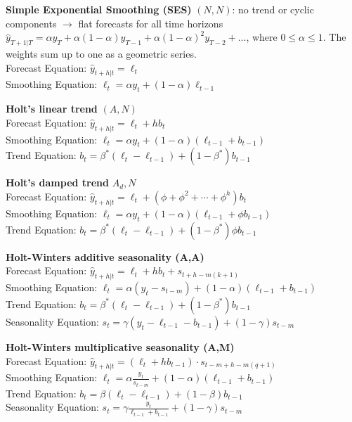 \begin{minipage}[t]{0.49\textwidth}
\textbf{Simple Exponential Smoothing (SES)} \((N,N)\): no trend or cyclic components \(\rightarrow\) flat forecasts for all time horizons\\
$ \hat{y}_{T+1|T} = \alpha y_{T} + \alpha (1 - \alpha) y_{T-1} + \alpha (1 - \alpha)^2 y_{T-2} + \ldots $,
where $ 0 \le \alpha \le 1 $. The weights sum up to one as a geometric series.\\
Forecast Equation: $ \hat{y}_{t+h|t} = \ell_t $\\
Smoothing Equation: $ \ell_t = \alpha y_t + (1 - \alpha) \ell_{t-1} $
\end{minipage}
\hfill
\begin{minipage}[t]{0.49\textwidth}
\textbf{Holt's linear trend} \((A,N)\)\\
Forecast Equation: $ \hat{y}_{t+h|t} = \ell_t + h b_{t} $\\
Smoothing Equation: $ \ell_t = \alpha y_t + (1 - \alpha) (\ell_{t-1} + b_{t-1}) $\\
Trend Equation: $ b_t = \beta^* (\ell_t - \ell_{t-1}) + (1 - \beta^*) b_{t-1} $

\textbf{Holt's damped trend} \(A_d,N\)\\
Forecast Equation: $ \hat{y}_{t+h|t} = \ell_t + (\phi + \phi^2 + \cdots + \phi^h) b_{t} $\\
Smoothing Equation: $ \ell_t = \alpha y_t + (1 - \alpha) (\ell_{t-1} + \phi b_{t-1}) $\\
Trend Equation: $ b_t = \beta^* (\ell_t - \ell_{t-1}) + (1 - \beta^*) \phi b_{t-1} $
\end{minipage}

\begin{minipage}[t]{0.49\textwidth}
\textbf{Holt-Winters additive seasonality (A,A)}\\
Forecast Equation: $ \hat{y}_{t+h|t} = \ell_t + hb_{t} + s_{t+h-m(k+1)} $\\
Smoothing Equation: $ \ell_t = \alpha (y_t - s_{t-m}) + (1 - \alpha)(\ell_{t-1} + b_{t-1}) $\\
Trend Equation: $ b_t = \beta^* (\ell_t - \ell_{t-1}) + (1 - \beta^*) b_{t-1} $\\
Seasonality Equation: $ s_t = \gamma (y_t - \ell_{t-1} - b_{t-1}) + (1 - \gamma) s_{t-m} $
\end{minipage}
\hfill
\begin{minipage}[t]{0.49\textwidth}
\textbf{Holt-Winters multiplicative seasonality (A,M)}\\
Forecast Equation: $ \hat{y}_{t+h|t} = (\ell_t + hb_{t-1}) \cdot s_{t-m+h-m(q+1)} $\\
Smoothing Equation: $ \ell_t = \alpha \frac{y_t}{s_{t-m}} + (1 - \alpha)(\ell_{t-1} + b_{t-1}) $\\
Trend Equation: $ b_t = \beta (\ell_t - \ell_{t-1}) + (1 - \beta) b_{t-1} $\\
Seasonality Equation: $ s_t = \gamma \frac{y_t}{\ell_{t-1} + b_{t-1}} + (1 - \gamma) s_{t-m} $
\end{minipage}

